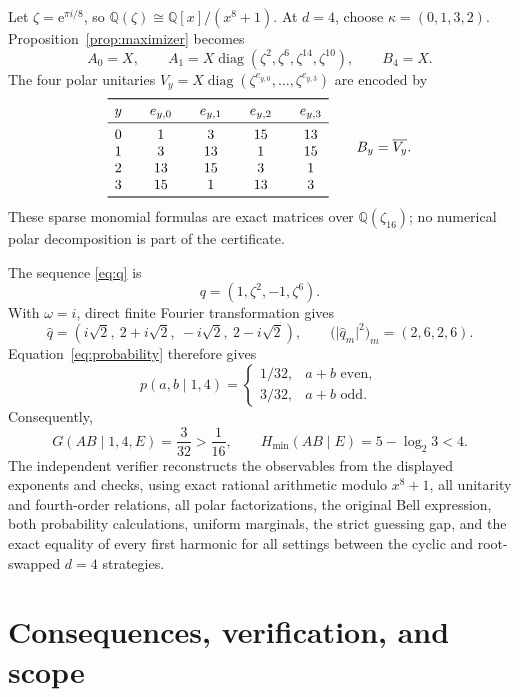 \documentclass[11pt]{article}
\theoremstyle{remark}
\newcommand{\e}{\mathrm e}
\begin{document}
Let \(\zeta=\e^{\pi i/8}\), so
\(\mathbb Q(\zeta)\cong\mathbb Q[x]/(x^8+1)\).  At \(d=4\), choose
\(\kappa=(0,1,3,2)\).  Proposition~\ref{prop:maximizer} becomes
\[
  A_0=X,\qquad
  A_1=X\operatorname{diag}(\zeta^2,\zeta^6,\zeta^{14},\zeta^{10}),
  \qquad B_4=X.
\]
The four polar unitaries
\(
V_y=X\operatorname{diag}(\zeta^{e_{y,0}},\ldots,\zeta^{e_{y,3}})
\)
are encoded by
\[
\begin{array}{c@{\qquad}c@{\qquad}c@{\qquad}c@{\qquad}c}
\toprule
y&e_{y,0}&e_{y,1}&e_{y,2}&e_{y,3}\\
\midrule
0&1&3&15&13\\
1&3&13&1&15\\
2&13&15&3&1\\
3&15&1&13&3\\
\bottomrule
\end{array}
\qquad B_y=\overline{V_y}.
\]
These sparse monomial formulas are exact matrices over
\(\mathbb Q(\zeta_{16})\); no numerical polar decomposition is part of the
certificate.

The sequence \eqref{eq:q} is
\[
  q=(1,\zeta^2,-1,\zeta^6).
\]
With \(\omega=i\), direct finite Fourier transformation gives
\[
  \widehat q=(i\sqrt2,\ 2+i\sqrt2,\ -i\sqrt2,\ 2-i\sqrt2),
  \qquad
  \bigl(\lvert\widehat q_m\rvert^2\bigr)_m=(2,6,2,6).
\]
Equation~\eqref{eq:probability} therefore gives
\begin{equation}
  p(a,b\mid1,4)=
  \begin{cases}
    1/32,&a+b\text{ even},\\
    3/32,&a+b\text{ odd}.
  \end{cases}
  \label{eq:d4-table}
\end{equation}
Consequently,
\[
  G(AB\mid1,4,E)=\frac3{32}>\frac1{16},
  \qquad
  H_{\min}(AB\mid E)=5-\log_2 3<4.
\]
The independent verifier reconstructs the observables from the displayed
exponents and checks, using exact rational arithmetic modulo \(x^8+1\),
all unitarity and fourth-order relations, all polar factorizations, the
original Bell expression, both probability calculations, uniform marginals,
the strict guessing gap, and the exact equality of every first harmonic for
all settings between the cyclic and root-swapped \(d=4\) strategies.

\section{Consequences, verification, and scope}
\end{document}
